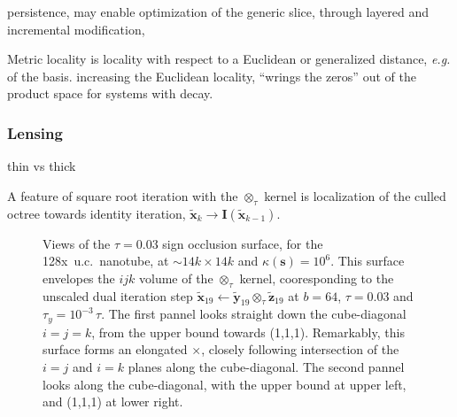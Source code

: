 \documentclass[letterpaper,twocolumn,amsmath,amsfont,amssymb,english,aps,jcp,preprintnumbers,groupaddress,nofootinbib,tightenlines,floatfix]{revtex4}
\newcommand{\mat}[1]{\boldsymbol{#1}}
\newcommand{\mmat}[1]{\widetilde{\boldsymbol{#1}}}
\newcommand{\ot}{  {\scriptstyle \otimes}_{ \tau } }
\theoremstyle{plain}
\theoremstyle{remark}
\theoremstyle{plain}
\begin{document}
persistence, may enable optimization of the generic slice, through layered and incremental modification, 

Metric locality is locality with respect to a Euclidean or generalized distance, {\em e.g.} of the basis.  
increasing the Euclidean locality, ``wrings the zeros'' out of the product space for systems with decay.


\subsubsection{Lensing}

thin vs thick

A feature of square root iteration with the $\ot$ kernel is localization of the culled octree towards identity iteration, 
$\widetilde{\mat{x}}_k \rightarrow \mat{I}\left( \widetilde{\mat{x}}_{k-1} \right)$.  



 \begin{figure}[h] \label{markofzorro}
 \caption{Views of the $\tau =0.03$ sign occlusion surface, for the 
 128x~u.c.~nanotube, at $\sim {14k \times 14k}$ and $\kappa(\mat{s})=10^6$. 
 This surface envelopes the $ijk$ volume of the $\ot$ kernel,  
 cooresponding to the unscaled dual iteration step $\mmat{x}_{19} \leftarrow \mmat{y}_{19} \ot \mmat{z}_{19} $ at $b=64$, $\tau=0.03$ and
 $\tau_y=10^{-3} \, \tau $.  The first pannel looks straight down the cube-diagonal $i=j=k$, from the upper bound towards (1,1,1).
 Remarkably, this surface forms an elongated $\times$, closely following intersection of the $i=j$  and $i=k$ planes 
 along the cube-diagonal. The second pannel looks along the cube-diagonal, with the upper bound at upper left, and (1,1,1) at lower right.}
 \end{figure}
\end{document}
